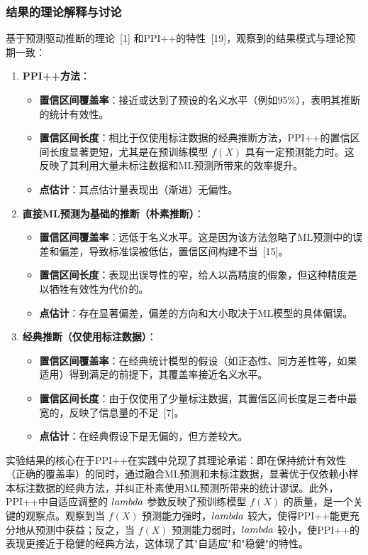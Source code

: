 \documentclass[12pt,a4paper]{article}
\begin{document}
\subsubsection{结果的理论解释与讨论}
\label{sec:expected_results_theory}
基于预测驱动推断的理论~{[1]} 和PPI++的特性~{[19]}，观察到的结果模式与理论预期一致：
\begin{enumerate}
    \item \textbf{PPI++方法}：
    \begin{itemize}
        \item \textbf{置信区间覆盖率}：接近或达到了预设的名义水平（例如95\%），表明其推断的统计有效性。
        \item \textbf{置信区间长度}：相比于仅使用标注数据的经典推断方法，PPI++的置信区间长度显著更短，尤其是在预训练模型 $f(X)$ 具有一定预测能力时。这反映了其利用大量未标注数据和ML预测所带来的效率提升。
        \item \textbf{点估计}：其点估计量表现出（渐进）无偏性。
    \end{itemize}
    \item \textbf{直接ML预测为基础的推断（朴素推断）}：
    \begin{itemize}
        \item \textbf{置信区间覆盖率}：远低于名义水平。这是因为该方法忽略了ML预测中的误差和偏差，导致标准误被低估，置信区间构建不当~{[15]}。
        \item \textbf{置信区间长度}：表现出误导性的窄，给人以高精度的假象，但这种精度是以牺牲有效性为代价的。
        \item \textbf{点估计}：存在显著偏差，偏差的方向和大小取决于ML模型的具体偏误。
    \end{itemize}
    \item \textbf{经典推断（仅使用标注数据）}：
    \begin{itemize}
        \item \textbf{置信区间覆盖率}：在经典统计模型的假设（如正态性、同方差性等，如果适用）得到满足的前提下，其覆盖率接近名义水平。
        \item \textbf{置信区间长度}：由于仅使用了少量标注数据，其置信区间长度是三者中最宽的，反映了信息量的不足~{[7]}。
        \item \textbf{点估计}：在经典假设下是无偏的，但方差较大。
    \end{itemize}
\end{enumerate}
实验结果的核心在于PPI++在实践中兑现了其理论承诺：即在保持统计有效性（正确的覆盖率）的同时，通过融合ML预测和未标注数据，显著优于仅依赖小样本标注数据的经典方法，并纠正朴素使用ML预测所带来的统计谬误。此外，PPI++中自适应调整的 $\\lambda$ 参数反映了预训练模型 $f(X)$ 的质量，是一个关键的观察点。观察到当 $f(X)$ 预测能力强时，$\\lambda$ 较大，使得PPI++能更充分地从预测中获益；反之，当 $f(X)$ 预测能力弱时，$\\lambda$ 较小，使PPI++的表现更接近于稳健的经典方法，这体现了其"自适应"和"稳健"的特性。
\end{document}
